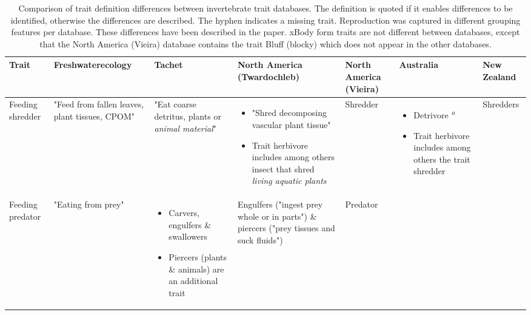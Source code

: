 \documentclass[../Draft_harmonization_paper.tex]{subfiles}
\begin{document}
\begin{landscape}
    \begin{longtable}{m{1.7cm}|m{3cm}|m{3cm}|m{3cm}|m{3cm}|m{3cm}|m{3cm}}
        \caption{Comparison of trait definition differences between invertebrate trait databases. The definition is quoted if it enables differences to be identified, otherwise the differences are described. The hyphen indicates a missing trait. Reproduction was captured in different grouping features per database. These differences have been described in the paper. xBody form traits are not different between databases, except that the North America (Vieira) database contains the trait Bluff (blocky) which does not appear in the other databases.}
        \label{tab:trait_definitions}
        \endfirsthead
        \hline
        Trait & Freshwaterecology & Tachet & \specialcell{North America \\ (Twardochleb)} & 
        North America (Vieira) & Australia & New Zealand \\
        \hline
        \hline
        Feeding shredder & 
        "Feed from fallen leaves, plant tissues, CPOM" & 
        "Eat coarse detritus, plants or \textit{animal material}" & 
        \begin{itemize}
            \item "Shred decomposing vascular plant tissue"
            \item Trait herbivore includes among others insect that shred \textit{living aquatic plants} 
        \end{itemize} & 
        Shredder & 
        \begin{itemize}
            \item Detrivore \textsuperscript{\textit{a}}
            \item Trait herbivore includes among others the trait shredder
        \end{itemize} & 
        Shredders
        \\ 
        \hline
        Feeding predator & 
        "Eating from prey" & 
        \begin{itemize}
            \item Carvers, engulfers \& swallowers
            \item Piercers (plants \& animals) are an additional trait
        \end{itemize} & %
        Engulfers ("ingest prey whole or in parts") \& 
        piercers ("prey tissues and suck fluids") & 
        Predator &

\end{longtable}
\end{landscape}
\end{document}
